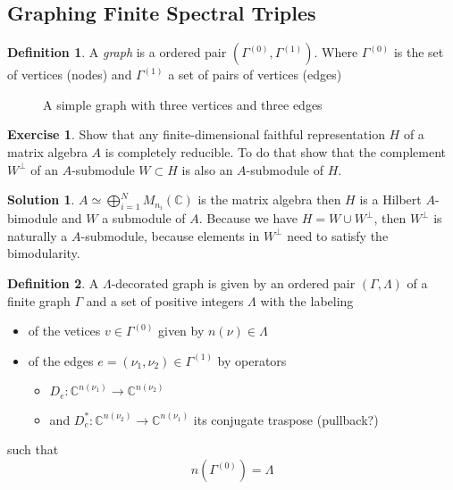 \documentclass[a4paper]{article}
\theoremstyle{definition}
\newtheorem{definition}{Definition}
\theoremstyle{definition}
\theoremstyle{definition}
\theoremstyle{theorem}
\theoremstyle{theorem}
\theoremstyle{theorem}
\newtheorem{exercise}{Exercise}
\theoremstyle{definition}
\newtheorem{solution}{Solution}
\begin{document}
\subsection{Graphing Finite Spectral Triples}
\begin{definition}
    A \textit{graph} is a ordered pair $(\Gamma ^{(0)}, \Gamma ^{(1)})$.
    Where $\Gamma ^{(0)}$ is the set of vertices (nodes) and $\Gamma ^{(1)}$
    a set of pairs of vertices (edges)
\end{definition}
\begin{figure}[h!]
    \centering
{}
    \caption{A simple graph with three vertices and three edges}
\end{figure}
\begin{exercise}
    Show that any finite-dimensional faithful representation $H$ of a matrix
    algebra $A$ is completely reducible. To do that show that the complement
    $W^{\perp}$ of an $A$-submodule $W\subset H$ is also an $A$-submodule
    of $H$.
\end{exercise}
\begin{solution}
    $A\simeq \bigoplus_{i=1}^N M_{n_i}(\mathbb{C})$ is the matrix algebra
    then $H$ is a Hilbert $A$-bimodule and $W$ a submodule of $A$.
    Because we have $H = W \cup W^{\perp}$, then $W^{\perp}$ is naturally a
    $A$-submodule, because elements in $W^{\perp}$ need to satisfy the
    bimodularity.
\end{solution}
\begin{definition}
    A $\Lambda$-decorated graph is given by an ordered pair $(\Gamma,
    \Lambda)$ of a finite graph $\Gamma$ and a set of positive integers
    $\Lambda$ with the labeling
    \begin{itemize}
        \item of the vetices $v\in \Gamma ^{(0)}$ given by $n(\nu) \in
            \Lambda$
        \item of the edges $e = (\nu _1, \nu _2) \in \Gamma ^{(1)}$ by
            operators
            \begin{itemize}
                \item $D_e: \mathbb{C}^{n(\nu _1)} \rightarrow
                    \mathbb{C}^{n(\nu _2)}$
                \item and $D_e^*: \mathbb{C}^{n(\nu _2)} \rightarrow
                    \mathbb{C}^{n(\nu _1)}$ its conjugate traspose
                    (pullback?)
            \end{itemize}
    \end{itemize}
    such that
    \begin{equation}
        n(\Gamma ^{(0)}) = \Lambda
    \end{equation}
\end{definition}
\end{document}

